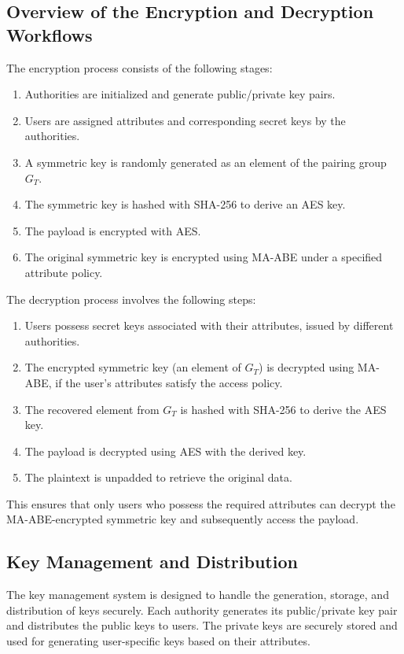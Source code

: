 \documentclass[cic,tc,english]{iiufrgs}
\begin{document}
        \subsection{Overview of the Encryption and Decryption Workflows}
            The encryption process consists of the following stages:
            \begin{enumerate}
                \item Authorities are initialized and generate public/private key pairs.
                \item Users are assigned attributes and corresponding secret keys by the authorities.
                \item A symmetric key is randomly generated as an element of the pairing group $G_T$.
                \item The symmetric key is hashed with SHA-256 to derive an AES key.
                \item The payload is encrypted with AES.
                \item The original symmetric key is encrypted using MA-ABE under a specified attribute policy.
            \end{enumerate}

            The decryption process involves the following steps:
            \begin{enumerate}
                \item Users possess secret keys associated with their attributes, issued by different authorities.
                \item The encrypted symmetric key (an element of $G_T$) is decrypted using MA-ABE, if the user's attributes satisfy the access policy.
                \item The recovered element from $G_T$ is hashed with SHA-256 to derive the AES key.
                \item The payload is decrypted using AES with the derived key.
                \item The plaintext is unpadded to retrieve the original data.
            \end{enumerate}

            This ensures that only users who possess the required attributes can decrypt the MA-ABE-encrypted symmetric key and subsequently access the payload.


        \subsection{Key Management and Distribution}
            The key management system is designed to handle the generation, storage, and distribution of keys securely. Each authority generates its public/private key pair and distributes the public keys to users. The private keys are securely stored and used for generating user-specific keys based on their attributes.
\end{document}
